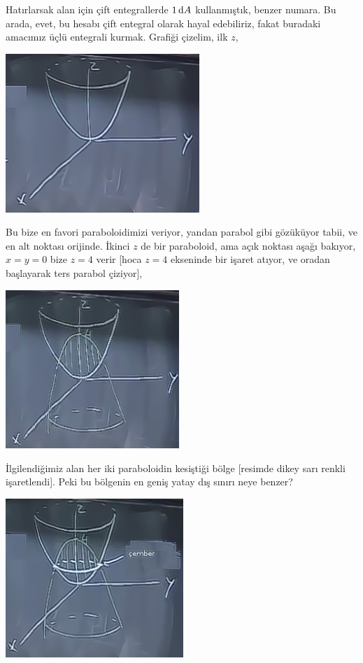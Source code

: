 \documentclass[12pt,fleqn]{article}\usepackage{../../common}
\begin{document}
Hatırlarsak alan için çift entegrallerde $1 \,\mathrm{d} A$ kullanmıştık, benzer
numara. Bu arada, evet, bu hesabı çift entegral olarak hayal edebiliriz,
fakat buradaki amacımız üçlü entegrali kurmak. Grafiği çizelim, ilk $z$,

\includegraphics[height=6cm]{25_2.png}

Bu bize en favori paraboloidimizi veriyor, yandan parabol gibi gözüküyor
tabii, ve en alt noktası orijinde. İkinci $z$ de bir paraboloid, ama açık
noktası aşağı bakıyor, $x=y=0$ bize $z=4$ verir [hoca $z=4$ ekseninde bir
işaret atıyor, ve oradan başlayarak ters parabol çiziyor], 

\includegraphics[height=6cm]{25_3.png}

İlgilendiğimiz alan her iki paraboloidin kesiştiği bölge [resimde dikey
sarı renkli işaretlendi]. Peki bu bölgenin en geniş yatay dış sınırı neye
benzer?

\includegraphics[height=6cm]{25_4.png}
\end{document}
